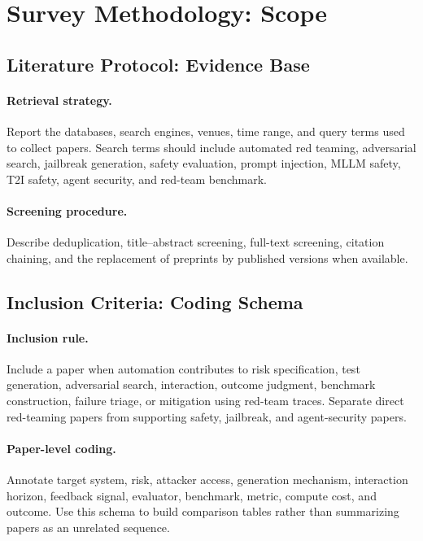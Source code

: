 \documentclass[review]{fcs}
\begin{document}
\section{Survey Methodology: Scope}
\label{sec:methodology}

\subsection{Literature Protocol: Evidence Base}

\paragraph{Retrieval strategy.}
Report the databases, search engines, venues, time range, and query terms used to collect papers. Search terms should include automated red teaming, adversarial search, jailbreak generation, safety evaluation, prompt injection, MLLM safety, T2I safety, agent security, and red-team benchmark.

\paragraph{Screening procedure.}
Describe deduplication, title--abstract screening, full-text screening, citation chaining, and the replacement of preprints by published versions when available.

\subsection{Inclusion Criteria: Coding Schema}

\paragraph{Inclusion rule.}
Include a paper when automation contributes to risk specification, test generation, adversarial search, interaction, outcome judgment, benchmark construction, failure triage, or mitigation using red-team traces. Separate direct red-teaming papers from supporting safety, jailbreak, and agent-security papers.

\paragraph{Paper-level coding.}
Annotate target system, risk, attacker access, generation mechanism, interaction horizon, feedback signal, evaluator, benchmark, metric, compute cost, and outcome. Use this schema to build comparison tables rather than summarizing papers as an unrelated sequence.
\end{document}
